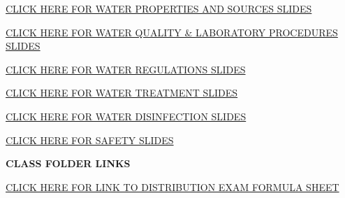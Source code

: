 \documentclass{article}
\begin{document}
\begin{tcolorbox}[width=17cm,box align=center, halign=center,  valign=center,colback={my-blue},title={}, colbacktitle=yellow,coltitle=blue]    
\href{https://sbasrai.github.io/Water_Properties_Sources/}{CLICK HERE FOR WATER PROPERTIES AND SOURCES SLIDES}
\end{tcolorbox} 

\begin{tcolorbox}[width=17cm,box align=center, halign=center,  valign=center,colback={my-blue},title={}, colbacktitle=yellow,coltitle=blue]    
\href{https://sbasrai.github.io/Water_Quality_Laboratory_Procedures/}{CLICK HERE FOR WATER QUALITY \& LABORATORY PROCEDURES SLIDES}
\end{tcolorbox} 
\begin{tcolorbox}[width=17cm,box align=center, halign=center,  valign=center,colback={my-blue},title={}, colbacktitle=yellow,coltitle=blue]    
\href{https://sbasrai.github.io/WaterRegulations/}{CLICK HERE FOR WATER REGULATIONS SLIDES}
\end{tcolorbox} 
%
\begin{tcolorbox}[width=17cm,box align=center, halign=center,  valign=center,colback={my-blue},title={}, colbacktitle=yellow,coltitle=blue]    
\href{https://sbasrai.github.io/WaterTreatment/}{CLICK HERE FOR WATER TREATMENT SLIDES}
\end{tcolorbox} 
\begin{tcolorbox}[width=17cm,box align=center, halign=center,  valign=center,colback={my-blue},title={}, colbacktitle=yellow,coltitle=blue]    
\href{https://sbasrai.github.io/WaterDisinfection/}{CLICK HERE FOR WATER DISINFECTION SLIDES}
\end{tcolorbox} 
%

\begin{tcolorbox}[width=17cm,box align=center, halign=center,  valign=center,colback={my-blue},title={}, colbacktitle=yellow,coltitle=blue]    
\href{https://sbasrai.github.io/Safety/}{CLICK HERE FOR SAFETY SLIDES}
\end{tcolorbox} 

\newpage

\textbf{CLASS FOLDER LINKS}

\begin{tcolorbox}[width=17cm,box align=center, halign=center,  valign=center,colback={my-blue},title={}, colbacktitle=yellow,coltitle=blue]    
\href{https://drive.google.com/file/d/1hGnysPD3GTU3sDS5mfSNv0RQzyp658JB/view?usp=sharing}{CLICK HERE FOR LINK TO DISTRIBUTION EXAM FORMULA SHEET}
\end{tcolorbox}
\end{document}
